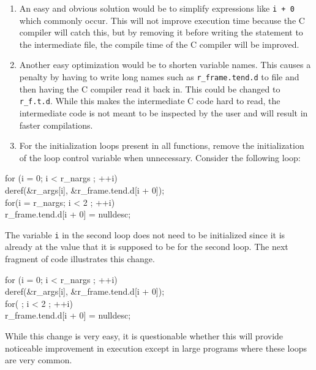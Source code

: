 \liststyleLxxxviii
\begin{enumerate}

\item An easy and obvious solution would be to simplify expressions like
\texttt{i + 0} which commonly occur. This will not improve execution
time because the C compiler will catch this, but by removing it before
writing the statement to the intermediate file, the compile time of
the C compiler will be improved.

\item Another easy optimization would be to shorten variable
names. This causes a penalty by having to write long names such as
\texttt{r\_frame.tend.d} to file and then having the C compiler read
it back in. This could be changed to \texttt{r\_f.t.d}. While this
makes the intermediate C code hard to read, the intermediate code is
not meant to be inspected by the user and will result in faster
compilations.

\item For the initialization loops present in all functions, remove the
initialization of the loop control variable when unnecessary. Consider
the following loop:
\end{enumerate}
\goodbreak
\begin{iconcode}
for (i = 0; i < r\_nargs ; ++i)\\
\>deref(\&r\_args[i], \&r\_frame.tend.d[i + 0]);\\
for(i = r\_nargs; i < 2 ; ++i)\\
\>r\_frame.tend.d[i + 0] = nulldesc;\\
\end{iconcode}


The variable \texttt{i} in the second loop does not need to be
initialized since it is already at the value that it is supposed to be
for the second loop. The next fragment of code illustrates this change.

\goodbreak
\begin{iconcode}
for (i = 0; i < r\_nargs ; ++i)\\
\>deref(\&r\_args[i], \&r\_frame.tend.d[i + 0]);\\
for( ; i < 2 ; ++i)\\
\>r\_frame.tend.d[i + 0] = nulldesc;\\
\end{iconcode}


While this change is very easy, it is questionable whether this will
provide noticeable improvement in execution except in large programs
where these loops are very common.

